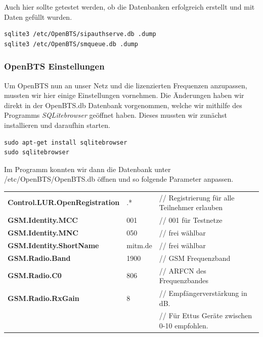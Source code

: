 Auch hier sollte getestet werden, ob die Datenbanken erfolgreich erstellt und mit Daten gefüllt wurden.
\begin{lstlisting}
sqlite3 /etc/OpenBTS/sipauthserve.db .dump
sqlite3 /etc/OpenBTS/smqueue.db .dump
\end{lstlisting}

\subsubsection{OpenBTS Einstellungen}
Um OpenBTS nun an unser Netz und die lizenzierten Frequenzen anzupassen, mussten wir hier einige Einstellungen vornehmen. Die Änderungen haben wir direkt in der OpenBTS.db Datenbank vorgenommen, welche wir mithilfe des Programms \textit{SQLitebrowser} geöffnet haben. Dieses mussten wir zunächst installieren und daraufhin starten.
\begin{lstlisting}
sudo apt-get install sqlitebrowser
sudo sqlitebrowser
\end{lstlisting}

Im Programm konnten wir dann die Datenbank unter /etc/OpenBTS/OpenBTS.db öffnen und so folgende Parameter anpassen.
\begin{table}[h]
	\centering
		\begin{tabular}{lll}
			\textbf{Control.LUR.OpenRegistration} & .* & // Registrierung für alle Teilnehmer erlauben\\
			\textbf{GSM.Identity.MCC} & 001 & // 001 für Testnetze\\
			\textbf{GSM.Identity.MNC} & 050 & // frei wählbar\\
			\textbf{GSM.Identity.ShortName} & mitm.de & // frei wählbar\\
			\textbf{GSM.Radio.Band} & 1900 & // GSM Frequenzband\\
			\textbf{GSM.Radio.C0} & 806 & // ARFCN des Frequenzbandes\\
			\textbf{GSM.Radio.RxGain} & 8 & // Empfängerverstärkung in dB.\\
			& & // Für Ettus Geräte zwischen 0-10 empfohlen.\\
		\end{tabular}
\end{table}

